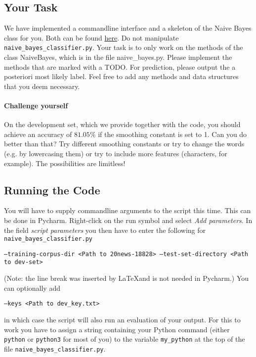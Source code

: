 \documentclass[11pt, a4paper]{article}
\begin{document}
\subsection{Your Task}
We have implemented a commandline interface and a skeleton of the Naive Bayes class for you. Both can be 
found \href{https://github.com/BasicProbability/Programming2018/blob/master/weekly\%20tasks/week\%204/homework/files_for_development.zip}{here}. Do not manipulate \texttt{naive\_bayes\_classifier.py}. Your task is to only work on the methods of the class NaiveBayes, which is in the file naive\_bayes.py. Please implement the methods that are marked with a TODO. For prediction, please output the 
a posteriori most likely label. Feel free to add any methods and data structures that you deem necessary.

\paragraph{Challenge yourself} On the development set, which we provide together with the code, you
should achieve an accuracy of $ 81.05\% $ if the smoothing constant is set to 1. Can you do better
than that? Try different smoothing constants or try to change the words (e.g. by lowercasing them) or
try to include more features (characters, for example). The possibilities are limitless! 

\subsection{Running the Code}
You will have to supply commandline arguments to the script this time. This can be done in Pycharm. 
Right-click on the run symbol and select \textit{Add parameters}. In the field \textit{script parameters}
you then have to enter the following for \texttt{naive\_bayes\_classifier.py}
\begin{center}
\texttt{--training-corpus-dir <Path to 20news-18828> --test-set-directory <Path to dev-set>}
\end{center}
(Note: the line break was inserted by \LaTeX and is not needed in Pycharm.)
You can optionally add
\begin{center}
\texttt{--keys <Path to dev\_key.txt>}
\end{center}
in which case the script will also run an evaluation of your output. For this to work you have to assign
a string containing your Python command (either \texttt{python} or \texttt{python3} for most of you)
to the variable \texttt{my\_python} at the top of the file \texttt{naive\_bayes\_classifier.py}.
\end{document}
